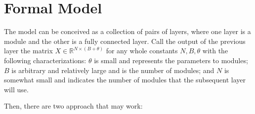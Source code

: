 \documentclass[12pt]{article}
\begin{document}
\begin{comment}
\paragraph{Outline}
The remainder of this article is organized as follows.
Section~\ref{Model} outlines the architecture of the model.
Our new and exciting results are described in Section~\ref{results}.
Finally, Section~\ref{conclusions} gives the conclusions.
\end{comment}

\section{Formal Model}\label{Formal Model}
\par The model can be conceived as a collection of pairs of layers, where one layer is a module and the other is a fully connected layer.  Call the output of the previous layer the matrix $X \in \mathbb{R}^{N\times(B+\theta)}$ for any whole constants $N, B, \theta$ with the following characterizations:  $\theta$ is small and represents the parameters to modules; $B$ is arbitrary and relatively large and is the number of modules; and $N$ is somewhat small and indicates the number of modules that the subsequent layer will use. \par 
Then, there are two approach that may work:
\end{document}
